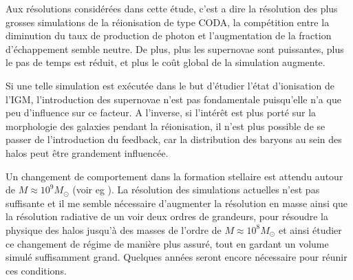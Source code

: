 Aux résolutions considérées dans cette étude, c'est a dire la résolution des plus grosses simulations de la réionisation de type CODA,  %
la compétition entre la diminution du taux de production de photon et l'augmentation de la fraction d'échappement semble neutre.
De plus, plus les supernovae sont puissantes, plus le pas de temps est réduit, et plus le coût global de la simulation augmente.

Si une telle simulation est exécutée dans le but d'étudier l'état d'ionisation de l'\ac{IGM}, l'introduction des supernovae n'est pas fondamentale puisqu'elle n'a que peu d'influence sur ce facteur.
A l'inverse, si l’intérêt est plus porté sur la morphologie des galaxies pendant la réionisation, il n'est plus possible de se passer de l'introduction du feedback, car la distribution des baryons au sein des halos peut être grandement influencée.


Un changement de comportement dans la formation stellaire est attendu autour de $M \approx 10^9M_\odot$ (voir eg \cite{2001PhR...349..125B}).
La résolution des simulations actuelles n'est pas suffisante et il me semble nécessaire d'augmenter la résolution en masse ainsi que la résolution radiative de un voir deux ordres de grandeurs, pour résoudre la physique des halos jusqu'à des masses de l'ordre de $M \approx 10^8M_\odot$ et ainsi étudier ce changement de régime de manière plus assuré, tout en gardant un volume simulé suffisamment grand.
Quelques années seront encore nécessaire pour réunir ces conditions.







